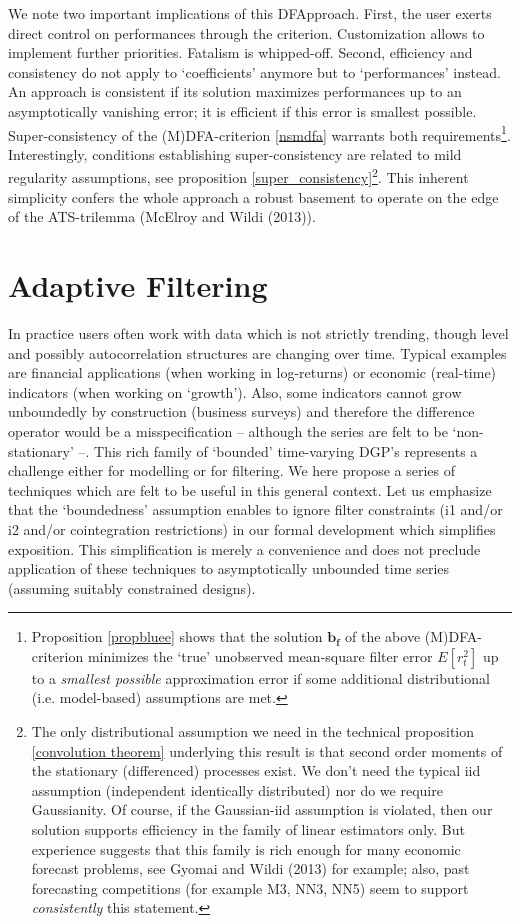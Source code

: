 \documentclass[11pt]{article}
\begin{document}
We note two important implications of this DFApproach. First, the user exerts direct control on performances through the criterion. Customization allows to implement further priorities. Fatalism is whipped-off. Second, efficiency and consistency do not apply to `coefficients' anymore but to `performances' instead. An approach is consistent if its solution maximizes performances up to an asymptotically vanishing error; it is  efficient if this error is smallest possible. Super-consistency of the (M)DFA-criterion \ref{nsmdfa} warrants both requirements\footnote{ Proposition \ref{propbluee} shows that the solution $\mathbf{b_f}$ of the above (M)DFA-criterion minimizes the `true' unobserved mean-square filter error $E[r_t^2]$ up to a \emph{smallest possible} approximation error if some additional distributional (i.e. model-based) assumptions are met.}. Interestingly, conditions establishing super-consistency are related to mild regularity assumptions, see proposition \ref{super_consistency}\footnote{The only distributional assumption we need in the technical proposition \ref{convolution theorem} underlying this result is that second order moments of the stationary (differenced) processes exist. We don't need the typical iid assumption (independent identically distributed) nor do we require Gaussianity. Of course, if the Gaussian-iid assumption is violated, then our solution supports efficiency in the family of linear estimators only. But experience  suggests that this family is rich enough for many economic forecast problems, see Gyomai and Wildi (2013) for example; also, past forecasting competitions (for example M3, NN3, NN5) seem to support \emph{consistently} this statement.}. This inherent simplicity confers the whole approach a robust basement to operate on the  edge of the ATS-trilemma (McElroy and Wildi (2013)). 





\section{Adaptive Filtering}



In practice users often work with data which is not strictly trending, though level and possibly autocorrelation structures are changing over time. Typical examples are financial applications (when working in log-returns) or economic (real-time) indicators (when working on `growth'). Also, some indicators cannot grow unboundedly by construction  (business surveys) and therefore the difference operator would be a misspecification -- although the series are felt to be `non-stationary' --. This rich family of `bounded' time-varying DGP's represents a challenge either for modelling or for filtering. We here propose a series of techniques which are felt to be useful in this  general context. Let us emphasize that the `boundedness' assumption enables to ignore filter constraints (i1 and/or i2 and/or cointegration restrictions) in our formal development which simplifies exposition. This simplification is merely a convenience and does not preclude application of these techniques to asymptotically unbounded time series (assuming suitably constrained designs).  \\
\end{document}
